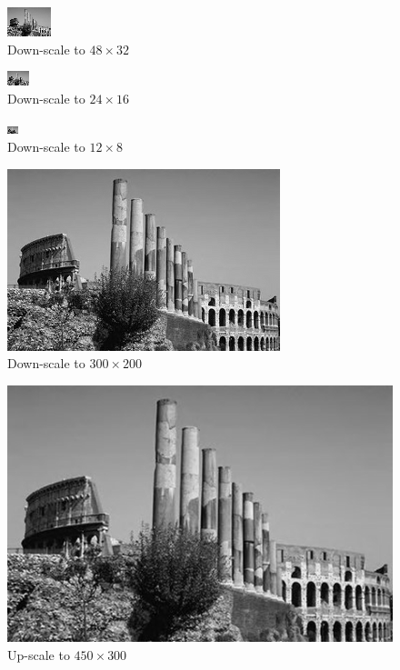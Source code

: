 \documentclass{article}
\begin{document}
\begin{figure}[H]
\centering
\includegraphics[width=36pt]{../result/scale-48-32.png}
\caption{Down-scale to $48 \times 32$}
\label{scale48}
\end{figure}

\begin{figure}[H]
\centering
\includegraphics[width=18pt]{../result/scale-24-16.png}
\caption{Down-scale to $24 \times 16$}
\label{scale24}
\end{figure}

\begin{figure}[H]
\centering
\includegraphics[width=9pt]{../result/scale-12-8.png}
\caption{Down-scale to $12 \times 8$}
\label{scale12}
\end{figure}

\begin{figure}[H]
\centering
\includegraphics[width=225pt]{../result/scale-300-200.png}
\caption{Down-scale to $300 \times 200$}
\label{scale300}
\end{figure}

\begin{figure}[H]
\centering
\includegraphics[width=337.5pt]{../result/scale-450-300.png}
\caption{Up-scale to $450 \times 300$}
\label{scale450}
\end{figure}
\end{document}
